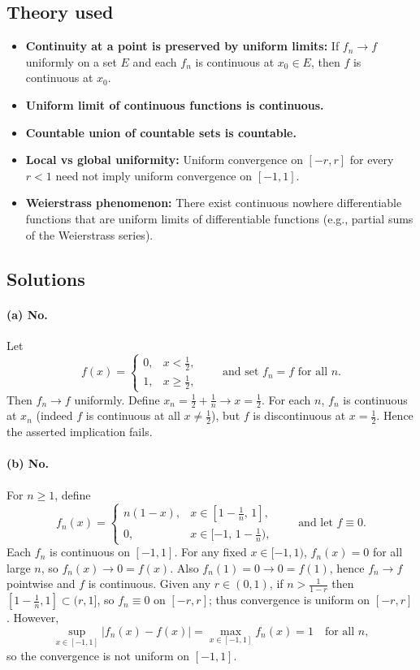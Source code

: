 \documentclass[12pt,a4paper]{article}
\theoremstyle{plain}
\theoremstyle{definition}
\theoremstyle{remark}
\theoremstyle{remark}
\begin{document}
\subsection*{Theory used}
\begin{itemize}
	\item \textbf{Continuity at a point is preserved by uniform limits:} If $f_n\to f$ uniformly on a set $E$ and each $f_n$ is continuous at $x_0\in E$, then $f$ is continuous at $x_0$.
	\item \textbf{Uniform limit of continuous functions is continuous.}
	\item \textbf{Countable union of countable sets is countable.}
	\item \textbf{Local vs global uniformity:} Uniform convergence on $[-r,r]$ for every $r<1$ need not imply uniform convergence on $[-1,1]$.
	\item \textbf{Weierstrass phenomenon:} There exist continuous nowhere differentiable functions that are uniform limits of differentiable functions (e.g., partial sums of the Weierstrass series).
\end{itemize}

\subsection*{Solutions}

\paragraph{(a) No.}
Let
\[
f(x)=\begin{cases}
	0,& x<\tfrac12,\\
	1,& x\ge \tfrac12,
\end{cases}
\qquad \text{and set } f_n=f \text{ for all } n.
\]
Then $f_n\to f$ uniformly. Define $x_n=\tfrac12+\tfrac1n\to x=\tfrac12$. For each $n$, $f_n$ is continuous at $x_n$ (indeed $f$ is continuous at all $x\ne \tfrac12$), but $f$ is discontinuous at $x=\tfrac12$. Hence the asserted implication fails.

\paragraph{(b) No.}
For $n\ge1$, define
\[
f_n(x)=
\begin{cases}
	n(1-x),& x\in[1-\tfrac1n,\,1],\\
	0,& x\in[-1,\,1-\tfrac1n),
\end{cases}
\qquad\text{and let } f\equiv 0.
\]
Each $f_n$ is continuous on $[-1,1]$. For any fixed $x\in[-1,1)$, $f_n(x)=0$ for all large $n$, so $f_n(x)\to 0=f(x)$. Also $f_n(1)=0\to 0=f(1)$, hence $f_n\to f$ pointwise and $f$ is continuous. Given any $r\in(0,1)$, if $n>\frac1{1-r}$ then $[1-\frac1n,1]\subset (r,1]$, so $f_n\equiv 0$ on $[-r,r]$; thus convergence is uniform on $[-r,r]$. However,
\[
\sup_{x\in[-1,1]}|f_n(x)-f(x)|=\max_{x\in[-1,1]} f_n(x)=1 \quad\text{for all }n,
\]
so the convergence is not uniform on $[-1,1]$.
\end{document}
